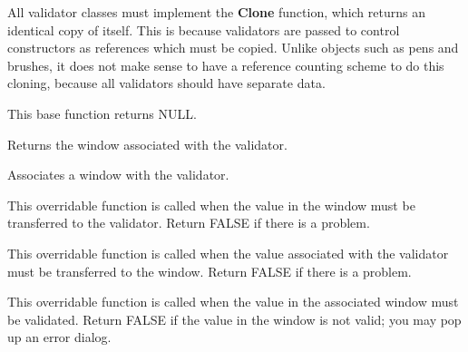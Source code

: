 All validator classes must implement the {\bf Clone} function, which returns
an identical copy of itself. This is because validators are passed to control
constructors as references which must be copied. Unlike objects such as pens
and brushes, it does not make sense to have a reference counting scheme
to do this cloning, because all validators should have separate
data.

This base function returns NULL.

\label{wxvalidatorgetwindow}


Returns the window associated with the validator.

\label{wxvalidatorsetwindow}


Associates a window with the validator.

\label{wxvalidatortransferfromwindow}


This overridable function is called when the value in the window must be
transferred to the validator. Return FALSE if there is a problem.

\label{wxvalidatortransfertowindow}


This overridable function is called when the value associated with the validator must be
transferred to the window. Return FALSE if there is a problem.

\label{wxvalidatorvalidate}


This overridable function is called when the value in the associated window must be validated.
Return FALSE if the value in the window is not valid; you may pop up an error dialog.


